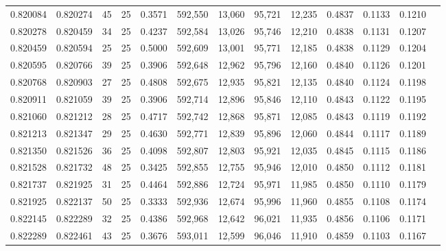 \begin{tabular}{rrrrrrrrrrrrr}
0.820084 & 0.820274 &    45 &  25 &                                     0.3571 & 592,550 &  13,060 &  95,721 &  12,235 & 0.4837 & 0.1133 & 0.1210 \\
0.820278 & 0.820459 &    34 &  25 &                                     0.4237 & 592,584 &  13,026 &  95,746 &  12,210 & 0.4838 & 0.1131 & 0.1207 \\
0.820459 & 0.820594 &    25 &  25 &                                     0.5000 & 592,609 &  13,001 &  95,771 &  12,185 & 0.4838 & 0.1129 & 0.1204 \\
0.820595 & 0.820766 &    39 &  25 &                                     0.3906 & 592,648 &  12,962 &  95,796 &  12,160 & 0.4840 & 0.1126 & 0.1201 \\
0.820768 & 0.820903 &    27 &  25 &                                     0.4808 & 592,675 &  12,935 &  95,821 &  12,135 & 0.4840 & 0.1124 & 0.1198 \\
0.820911 & 0.821059 &    39 &  25 &                                     0.3906 & 592,714 &  12,896 &  95,846 &  12,110 & 0.4843 & 0.1122 & 0.1195 \\
0.821060 & 0.821212 &    28 &  25 &                                     0.4717 & 592,742 &  12,868 &  95,871 &  12,085 & 0.4843 & 0.1119 & 0.1192 \\
0.821213 & 0.821347 &    29 &  25 &                                     0.4630 & 592,771 &  12,839 &  95,896 &  12,060 & 0.4844 & 0.1117 & 0.1189 \\
0.821350 & 0.821526 &    36 &  25 &                                     0.4098 & 592,807 &  12,803 &  95,921 &  12,035 & 0.4845 & 0.1115 & 0.1186 \\
0.821528 & 0.821732 &    48 &  25 &                                     0.3425 & 592,855 &  12,755 &  95,946 &  12,010 & 0.4850 & 0.1112 & 0.1181 \\
0.821737 & 0.821925 &    31 &  25 &                                     0.4464 & 592,886 &  12,724 &  95,971 &  11,985 & 0.4850 & 0.1110 & 0.1179 \\
0.821925 & 0.822137 &    50 &  25 &                                     0.3333 & 592,936 &  12,674 &  95,996 &  11,960 & 0.4855 & 0.1108 & 0.1174 \\
0.822145 & 0.822289 &    32 &  25 &                                     0.4386 & 592,968 &  12,642 &  96,021 &  11,935 & 0.4856 & 0.1106 & 0.1171 \\
0.822289 & 0.822461 &    43 &  25 &                                     0.3676 & 593,011 &  12,599 &  96,046 &  11,910 & 0.4859 & 0.1103 & 0.1167 \\

\end{tabular}

